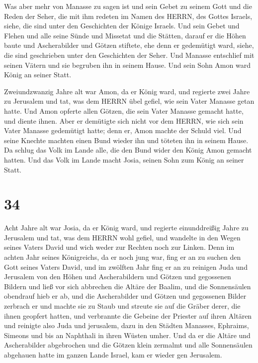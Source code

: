  Was aber mehr von Manasse zu sagen ist und sein Gebet zu
seinem Gott und die Reden der Seher, die mit ihm redeten im Namen des
HERRN, des Gottes Israels, siehe, die sind unter den Geschichten der
Könige Israels.  Und sein Gebet und Flehen und alle seine
Sünde und Missetat und die Stätten, darauf er die Höhen baute und
Ascherabilder und Götzen stiftete, ehe denn er gedemütigt ward, siehe,
die sind geschrieben unter den Geschichten der Seher.  Und
Manasse entschlief mit seinen Vätern und sie begruben ihn in seinem
Hause. Und sein Sohn Amon ward König an seiner Statt.

 Zweiundzwanzig Jahre alt war Amon, da er König ward, und
regierte zwei Jahre zu Jerusalem  und tat, was dem HERRN
übel gefiel, wie sein Vater Manasse getan hatte. Und Amon opferte allen
Götzen, die sein Vater Manasse gemacht hatte, und diente ihnen.
 Aber er demütigte sich nicht vor dem HERRN, wie sich sein
Vater Manasse gedemütigt hatte; denn er, Amon machte der Schuld viel.
 Und seine Knechte machten einen Bund wieder ihn und
töteten ihn in seinem Hause.  Da schlug das Volk im Lande
alle, die den Bund wider den König Amon gemacht hatten. Und das Volk im
Lande macht Josia, seinen Sohn zum König an seiner Statt.

\hypertarget{section-33}{%
\section{34}\label{section-33}}

 Acht Jahre alt war Josia, da er König ward, und regierte
einunddreißig Jahre zu Jerusalem  und tat, was dem HERRN
wohl gefiel, und wandelte in den Wegen seines Vaters David und wich
weder zur Rechten noch zur Linken.  Denn im achten Jahr
seines Königreichs, da er noch jung war, fing er an zu suchen den Gott
seines Vaters David, und im zwölften Jahr fing er an zu reinigen Juda
und Jerusalem von den Höhen und Ascherabildern und Götzen und gegossenen
Bildern  und ließ vor sich abbrechen die Altäre der Baalim,
und die Sonnensäulen obendrauf hieb er ab, und die Ascherabilder und
Götzen und gegossenen Bilder zerbrach er und machte sie zu Staub und
streute sie auf die Gräber derer, die ihnen geopfert hatten,
 und verbrannte die Gebeine der Priester auf ihren Altären
und reinigte also Juda und jerusalem,  dazu in den Städten
Manasses, Ephraims, Simeons und bis an Naphthali in ihren Wüsten umher.
 Und da er die Altäre und Ascherabilder abgebrochen und die
Götzen klein zermalmt und alle Sonnensäulen abgehauen hatte im ganzen
Lande Israel, kam er wieder gen Jerusalem.

